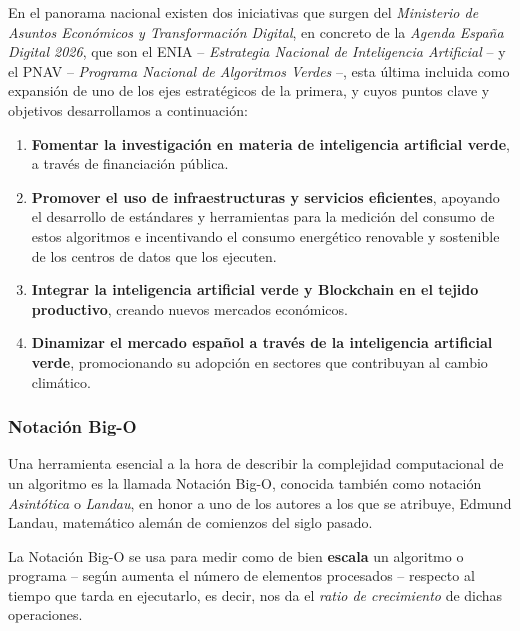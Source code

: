 \documentclass[00-Trabajo_Final.tex]{subfiles}
\begin{document}

En el panorama nacional existen dos iniciativas que surgen del \textit{Ministerio de Asuntos Económicos y Transformación Digital}, en concreto de la \textit{Agenda España Digital 2026}, que son el ENIA \cite{libro_ENIA}{ }--{ }\textit{Estrategia Nacional de Inteligencia Artificial}{ }--{ }y el PNAV \cite{libro_PNAV}{ }--{ }\textit{Programa Nacional de Algoritmos Verdes}{ }--{}, esta última incluida como expansión de uno de los ejes estratégicos de la primera, y cuyos puntos clave y objetivos desarrollamos a continuación:

\begin{enumerate}[noitemsep, topsep=5pt]
    \item \textbf{Fomentar la investigación en materia de inteligencia artificial verde}, a través de financiación pública.
    \item \textbf{Promover el uso de infraestructuras y servicios eficientes}, apoyando el desarrollo de estándares y herramientas para la medición del consumo de estos algoritmos e incentivando el consumo energético renovable y sostenible de los centros de datos que los ejecuten.
    \item \textbf{Integrar la inteligencia artificial verde y Blockchain en el tejido productivo}, creando nuevos mercados económicos.
    \item \textbf{Dinamizar el mercado español a través de la inteligencia artificial verde}, promocionando su adopción en sectores que contribuyan al cambio climático.
\end{enumerate}

\subsubsection{Notación Big-O}
Una herramienta esencial a la hora de describir la complejidad computacional de un algoritmo es la llamada Notación Big-O, conocida también como notación \textit{Asintótica} o \textit{Landau}, en honor a uno de los autores a los que se atribuye, Edmund Landau, matemático alemán de comienzos del siglo pasado.

La Notación Big-O se usa para medir como de bien \textbf{escala} un algoritmo o programa{ }--{ }según aumenta el número de elementos procesados{ }--{ }respecto al tiempo que tarda en ejecutarlo, es decir, nos da el \textit{ratio de crecimiento} de dichas operaciones.
\end{document}
